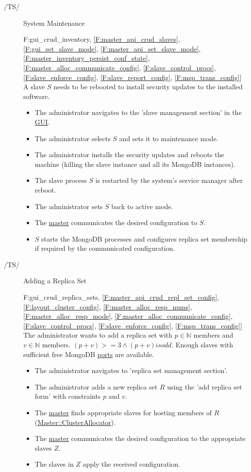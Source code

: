 \documentclass[a4paper, 11pt]{article}
\makeatletter
\def\namedlabel#1#2{\begingroup
    #2%
    \def\@currentlabel{#2}%
    \phantomsection\label{#1}\endgroup
}
\newcommand{\oitem}[2]{
  \@ifundefined{c@oitem#1}{\newcounter{oitem#1}}{} %
  \addtocounter{oitem#1}{10}
  \item[\namedlabel{#1:#2}{/#1\arabic{oitem#1}/}]
}
\newcommand{\testsequence}[3][]{
	\begin{description}[leftmargin=!,labelwidth=\widthof{\bfseries Preconditions}]
		\ifthenelse{\equal{#1}{}}
		{} %
		{\item[Tests] #1}
		\item[Preconditions] #2
		\item[Steps] #3
	\end{description}
}
\makeatother
\begin{document}
\begin{description}
\oitem{TS}{} System Maintenance
\testsequence
[\ref{F:gui_crud_inventory}, \ref{F:master_api_crud_slaves}, \ref{F:gui_set_slave_mode}, \ref{F:master_api_set_slave_mode}, \ref{F:master_inventory_persist_conf_state}, \ref{F:master_alloc_communicate_config}, \ref{F:slave_control_procs}, \ref{F:slave_enforce_config}, \ref{F:slave_report_config}, \ref{F:msp_trans_config}]
{
	A \gls{slave} $S$ needs to be rebooted to install security updates to the installed software.
}
{
	\begin{itemize}
		\item The \gls{administrator} navigates to the 'slave management section' in the \hyperref[SM:GUI]{GUI}. %
		\item The \gls{administrator} selects $S$ and sets it to \gls{maintenance mode}.
		\item The \gls{administrator} installs the security updates and reboots the machine (killing the \gls{slave} instance and all its \gls{MongoDB} instances).
		\item The \gls{slave} process $S$ is restarted by the system's service manager after reboot.
		\item The \gls{administrator} sets $S$ back to \gls{active mode}.
		\item The \hyperref[SM:Master]{master} communicates the desired configuration to $S$.
		\item $S$ starts the \gls{MongoDB} processes and configures \gls{replica set} membership if required by the communicated configuration.
	\end{itemize}
}


\oitem{TS}{} Adding a Replica Set
\testsequence
[\ref{F:gui_crud_replica_sets}, \ref{F:master_api_crud_repl_set_config}, \ref{F:layout_cluster_config}, \ref{F:master_alloc_resp_nums}, \ref{F:master_alloc_resp_mode}, \ref{F:master_alloc_communicate_config}, \ref{F:slave_control_procs}, \ref{F:slave_enforce_config}, \ref{F:msp_trans_config}]
{
	The \gls{administrator} wants to add a \gls{replica set} with $p \in \mathbb{N}$  members and $v \in \mathbb{N}$  members. $(p+v) >= 3 \land (p+v) is odd$. Enough \glspl{slave} with sufficient free \gls{MongoDB} \hyperref[D:slave_mongod_portrange]{ports} are available.
}
{
	\begin{itemize}
		\item The \gls{administrator} navigates to 'replica set management section'. %
		\item The \gls{administrator} adds a new replica set $R$ using the 'add replica set form' with constraints $p$ and $v$. %
		\item The \hyperref[SM:Master]{master} finds appropriate \glspl{slave} for hosting members of $R$ (\hyperref[SM:master_clusterallocator]{Master::ClusterAllocator}).
		\item The \hyperref[SM:Master]{master} communicates the desired configuration to the appropriate \glspl{slave} $Z$.
		\item The \glspl{slave} in $Z$ apply the received configuration.
	\end{itemize}
}


\end{description}
\end{document}
